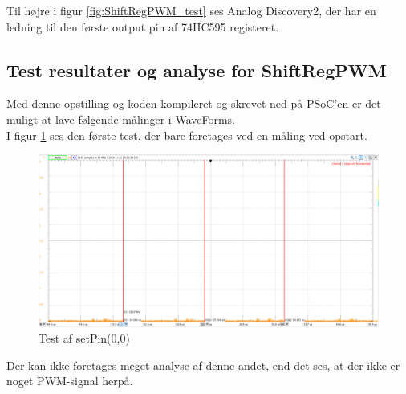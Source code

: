 \documentclass[Modultest/Modultest_main.tex]{subfiles}
\begin{document}
Til højre i figur \ref{fig:ShiftRegPWM_test} ses Analog Discovery2, der har en ledning til den første output pin af 74HC595 registeret.

\subsection{Test resultater og analyse for ShiftRegPWM}

Med denne opstilling og koden kompileret og skrevet ned på PSoC'en er det muligt at lave følgende målinger i WaveForms.
\\I figur \ref{fig:test_0_pin_0} ses den første test, der bare foretages ved en måling ved opstart.

\begin{figure}[H]
    \centering
    \includegraphics[width=\textwidth]{Modultest/CupLight/graphics/pwm_0.png}
    \caption{Test af setPin(0,0)}
    \label{fig:test_0_pin_0}
\end{figure}
Der kan ikke foretages meget analyse af denne andet, end det ses, at der ikke er noget PWM-signal herpå.
\end{document}
